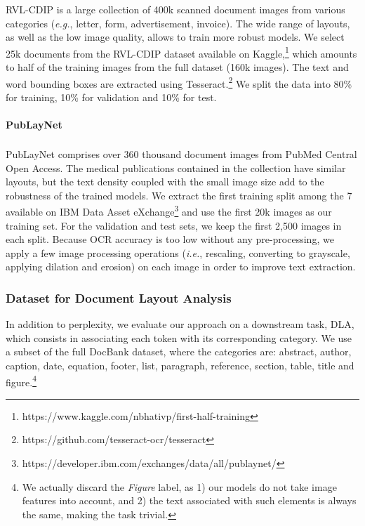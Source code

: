 RVL-CDIP is a large collection of 400k scanned document images from various categories (\textit{e.g.}, letter, form, advertisement, invoice). The wide range of layouts, as well as the low image quality, allows to train more robust models. We select 25k documents from the RVL-CDIP dataset available on Kaggle,\footnote{https://www.kaggle.com/nbhativp/first-half-training} which amounts to half of the training images from the full dataset (160k images). The text and word bounding boxes are extracted using Tesseract.\footnote{https://github.com/tesseract-ocr/tesseract} We split the data into 80\% for training, 10\% for validation and 10\% for test.

\paragraph{PubLayNet}

PubLayNet comprises over 360 thousand document images from PubMed Central\textsuperscript{\texttrademark} Open Access. The medical publications contained in the collection have similar layouts, but the text density coupled with the small image size add to the robustness of the trained models. We extract the first training split among the 7 available on IBM Data Asset eXchange\footnote{https://developer.ibm.com/exchanges/data/all/publaynet/} and use the first 20k images as our training set. For the validation and test sets, we keep the first 2,500 images in each split. Because OCR accuracy is too low without any pre-processing, we apply a few image processing operations (\textit{i.e.}, rescaling, converting to grayscale, applying dilation and erosion) on each image in order to improve text extraction.

\subsubsection{Dataset for Document Layout Analysis}

In addition to perplexity, we evaluate our approach on a downstream task, \ac{DLA}, which consists in associating each token with its corresponding category. We use a subset of the full DocBank dataset, where the categories are: abstract, author, caption, date, equation, footer, list, paragraph, reference, section, table, title and figure.\footnote{We actually discard the \textit{Figure} label, as 1) our models do not take image features into account, and 2) the text associated with such elements is always the same, making the task trivial.}

